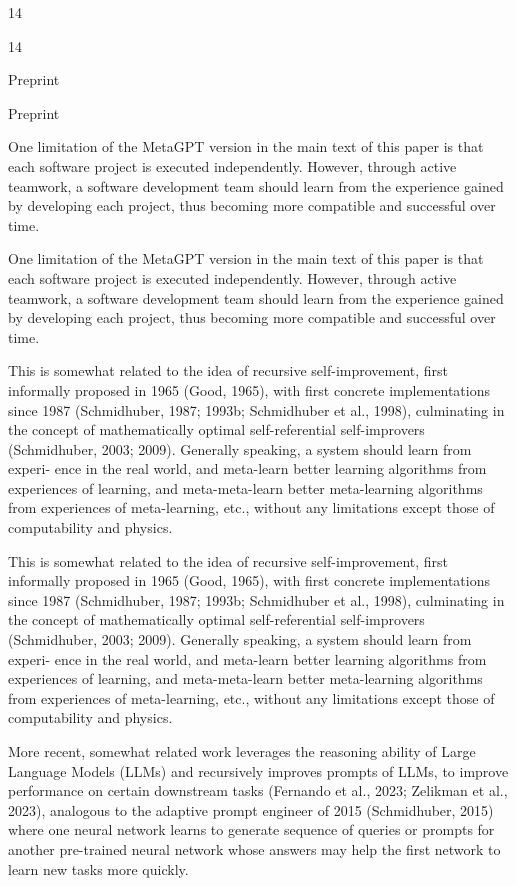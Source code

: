 \documentclass[12pt]{article}
\begin{document}
14


14


Preprint


Preprint


One limitation of the MetaGPT version in the main text of this paper is that each software project is
executed independently. However, through active teamwork, a software development team should
learn from the experience gained by developing each project, thus becoming more compatible and
successful over time.


One limitation of the MetaGPT version in the main text of this paper is that each software project is
executed independently. However, through active teamwork, a software development team should
learn from the experience gained by developing each project, thus becoming more compatible and
successful over time.


This is somewhat related to the idea of recursive self-improvement, first informally proposed in
1965 (Good, 1965), with first concrete implementations since 1987 (Schmidhuber, 1987; 1993b;
Schmidhuber et al., 1998), culminating in the concept of mathematically optimal self-referential
self-improvers (Schmidhuber, 2003; 2009). Generally speaking, a system should learn from experi-
ence in the real world, and meta-learn better learning algorithms from experiences of learning, and
meta-meta-learn better meta-learning algorithms from experiences of meta-learning, etc., without
any limitations except those of computability and physics.


This is somewhat related to the idea of recursive self-improvement, first informally proposed in
1965 (Good, 1965), with first concrete implementations since 1987 (Schmidhuber, 1987; 1993b;
Schmidhuber et al., 1998), culminating in the concept of mathematically optimal self-referential
self-improvers (Schmidhuber, 2003; 2009). Generally speaking, a system should learn from experi-
ence in the real world, and meta-learn better learning algorithms from experiences of learning, and
meta-meta-learn better meta-learning algorithms from experiences of meta-learning, etc., without
any limitations except those of computability and physics.


More recent, somewhat related work leverages the reasoning ability of Large Language Models
(LLMs) and recursively improves prompts of LLMs, to improve performance on certain downstream
tasks (Fernando et al., 2023; Zelikman et al., 2023), analogous to the adaptive prompt engineer of
2015 (Schmidhuber, 2015) where one neural network learns to generate sequence of queries or
prompts for another pre-trained neural network whose answers may help the first network to learn
new tasks more quickly.
\end{document}
